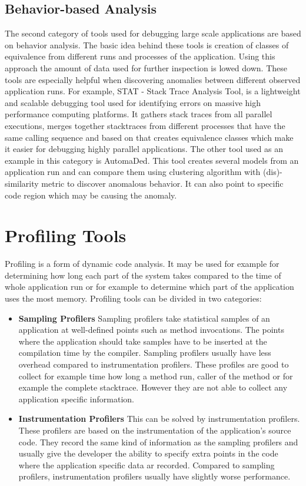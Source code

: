 \subsection{Behavior-based Analysis}
The second category of tools used for debugging large scale applications are based on behavior analysis. The basic idea behind these tools is creation of classes of equivalence from different runs and processes of the application. Using this approach the amount of data used for further inspection is lowed down. These tools are especially helpful when discovering anomalies between different observed application runs. For example, STAT - Stack Trace Analysis Tool, is a lightweight and scalable debugging tool used for identifying errors on massive high performance computing platforms. It gathers stack traces from all parallel executions, merges together stacktraces from different processes that have the same calling sequence and based on that creates equivalence classes which make it easier for debugging highly parallel applications. 
The other tool used as an example in this category is AutomaDed. This tool creates several models from an application run and can compare them using clustering algorithm with (dis)-similarity metric to discover anomalous behavior. It can also point to specific code region which may be causing the anomaly.

\section{Profiling Tools}
Profiling is a form of dynamic code analysis. It may be used for example for determining how long each part of the system takes compared to the time of whole application run or for example to determine which part of the application uses the most memory. Profiling tools can be divided in two categories:
\begin{itemize}
	\item \textbf{Sampling Profilers} \newline
Sampling profilers take statistical samples of an application at well-defined points such as method invocations. The points where the application should take samples have to be inserted at the compilation time by the compiler. Sampling profilers usually have less overhead compared to instrumentation profilers. These profiles are good to collect for example time how long a method run, caller of the method or for example the complete stacktrace. However they are not able to collect any application specific information.
	\item \textbf{Instrumentation Profilers} \newline
This can be solved by instrumentation profilers. These profilers are based on the instrumentation of the application's source code. They record the same kind of information as the sampling profilers and usually give the developer the ability to specify extra points in the code where the application specific data ar recorded. Compared to sampling profilers, instrumentation profilers usually have slightly worse performance.
\end{itemize}

